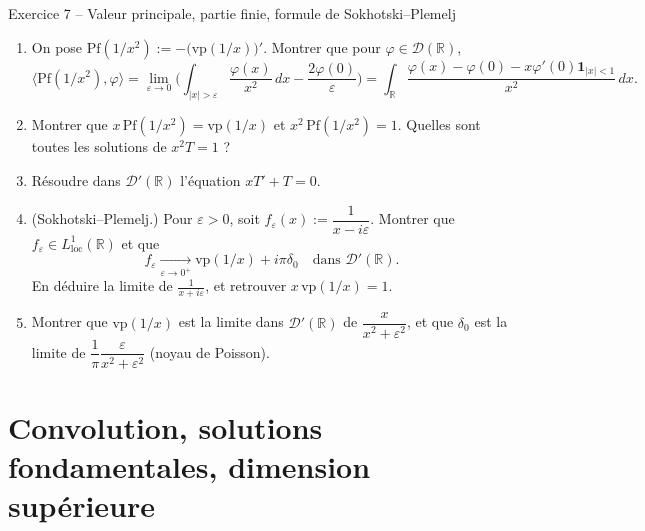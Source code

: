 \documentclass[11pt,a4paper]{article}
\newcommand{\R}{\mathbb{R}}
\newcommand{\D}{\mathcal{D}}
\theoremstyle{definition}
\begin{document}
\begin{exo}{Exercice 7 -- Valeur principale, partie finie, formule de Sokhotski--Plemelj}
\begin{enumerate}[label=(\alph*)]
  \item On pose $\mathrm{Pf}(1/x^2):=-\big(\mathrm{vp}(1/x)\big)'$. Montrer que pour $\varphi\in\D(\R)$,
  \[
  \big\langle\mathrm{Pf}(1/x^2),\varphi\big\rangle=\lim_{\varepsilon\to0}\Big(\int_{|x|>\varepsilon}\frac{\varphi(x)}{x^2}\,dx-\frac{2\varphi(0)}\varepsilon\Big)=\int_\R\frac{\varphi(x)-\varphi(0)-x\varphi'(0)\mathbf 1_{|x|<1}}{x^2}\,dx .
  \]
  \item Montrer que $x\,\mathrm{Pf}(1/x^2)=\mathrm{vp}(1/x)$ et $x^2\,\mathrm{Pf}(1/x^2)=1$. Quelles sont toutes les solutions de $x^2T=1$ ?
  \item Résoudre dans $\D'(\R)$ l'équation $xT'+T=0$.
  \item (Sokhotski--Plemelj.) Pour $\varepsilon>0$, soit $f_\varepsilon(x):=\dfrac1{x-i\varepsilon}$. Montrer que $f_\varepsilon\in L^1_{\mathrm{loc}}(\R)$ et que
  \[
  f_\varepsilon\xrightarrow[\varepsilon\to0^+]{}\mathrm{vp}(1/x)+i\pi\delta_0\quad\text{dans }\D'(\R).
  \]
  En déduire la limite de $\frac1{x+i\varepsilon}$, et retrouver $x\,\mathrm{vp}(1/x)=1$.
  \item Montrer que $\mathrm{vp}(1/x)$ est la limite dans $\D'(\R)$ de $\dfrac{x}{x^2+\varepsilon^2}$, et que $\delta_0$ est la limite de $\dfrac1\pi\dfrac{\varepsilon}{x^2+\varepsilon^2}$ (noyau de Poisson).
\end{enumerate}
\end{exo}

\section*{Convolution, solutions fondamentales, dimension supérieure}
\end{document}
